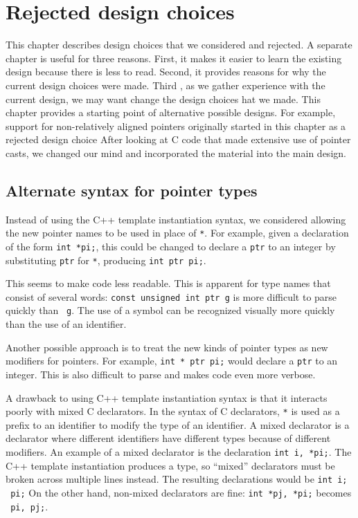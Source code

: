 
\chapter{Rejected design choices}
\label{chapter:design-alternatives}

This chapter describes design choices that we considered and rejected.
A separate chapter is useful for three reasons.   First, it makes it 
easier to learn the existing design because there is less to read.
Second, it provides reasons for why the current
design choices were made.  Third , as we gather experience with the current
design, we may want change the design choices hat we made. 
This chapter provides a starting point 
of alternative possible designs.  For example, support for non-relatively 
aligned pointers originally started in this chapter as a rejected design choice 
After looking at C code that
made extensive use of pointer casts, we changed our mind and incorporated
the material into the main design.

\section{Alternate syntax for pointer types}

Instead of using the C++ template instantiation syntax, we
considered allowing the new pointer names to be used in place of \texttt{*}.
For example, given a declaration of the form \texttt{int *pi;}, this could be changed
to declare a \texttt{ptr} to an integer by substituting \texttt{ptr} for \texttt{*},
producing \texttt{int ptr pi;}.
  
This seems to make code less readable.  This is apparent for type names that 
consist of several words: \texttt{const unsigned int ptr g} is more
difficult to parse quickly than \texttt{ g}.
The use of a symbol can be recognized visually more quickly than the use 
of an identifier.  

Another possible approach is to treat the new kinds
of pointer types  as new modifiers for pointers.  For example, 
\texttt{int * ptr pi;} would declare a \texttt{ptr} to an integer. This is 
also difficult to parse and makes code even more verbose.

A drawback to using C++ template instantiation syntax is that it interacts
poorly with mixed C declarators. In the syntax of C declarators, \texttt{*} is used as
a prefix to an identifier to modify the type of an identifier. A mixed
declarator is a declarator where different identifiers have different
types because of different modifiers. An example of a mixed declarator
is the declaration \texttt{int i, *pi;}. The C++ template instantiation produces a
type, so ``mixed'' declarators must be broken across multiple
lines instead. The resulting declarations would be 
\texttt{int i; \ptrint\ pi;} On the other hand, non-mixed
declarators are fine: \texttt{int *pj, *pi;} becomes
\texttt{\ptrint\ pi, pj;}.

